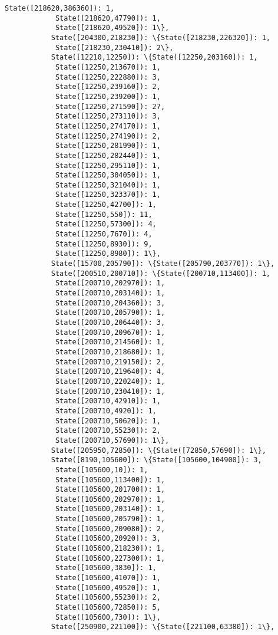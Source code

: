\documentclass[11pt]{article}
\begin{document}
\begin{Verbatim}[commandchars=\\\{\}]
            State([218620,386360]): 1,
            State([218620,47790]): 1,
            State([218620,49520]): 1\},
           State([204300,218230]): \{State([218230,226320]): 1,
            State([218230,230410]): 2\},
           State([12210,12250]): \{State([12250,203160]): 1,
            State([12250,213670]): 1,
            State([12250,222880]): 3,
            State([12250,239160]): 2,
            State([12250,239200]): 1,
            State([12250,271590]): 27,
            State([12250,273110]): 3,
            State([12250,274170]): 1,
            State([12250,274190]): 2,
            State([12250,281990]): 1,
            State([12250,282440]): 1,
            State([12250,295110]): 1,
            State([12250,304050]): 1,
            State([12250,321040]): 1,
            State([12250,323370]): 1,
            State([12250,42700]): 1,
            State([12250,550]): 11,
            State([12250,57300]): 4,
            State([12250,7670]): 4,
            State([12250,8930]): 9,
            State([12250,8980]): 1\},
           State([15700,205790]): \{State([205790,203770]): 1\},
           State([200510,200710]): \{State([200710,113400]): 1,
            State([200710,202970]): 1,
            State([200710,203140]): 1,
            State([200710,204360]): 3,
            State([200710,205790]): 1,
            State([200710,206440]): 3,
            State([200710,209670]): 1,
            State([200710,214560]): 1,
            State([200710,218680]): 1,
            State([200710,219150]): 2,
            State([200710,219640]): 4,
            State([200710,220240]): 1,
            State([200710,230410]): 1,
            State([200710,42910]): 1,
            State([200710,4920]): 1,
            State([200710,50620]): 1,
            State([200710,55230]): 2,
            State([200710,57690]): 1\},
           State([205950,72850]): \{State([72850,57690]): 1\},
           State([8190,105600]): \{State([105600,104900]): 3,
            State([105600,10]): 1,
            State([105600,113400]): 1,
            State([105600,201700]): 1,
            State([105600,202970]): 1,
            State([105600,203140]): 1,
            State([105600,205790]): 1,
            State([105600,209080]): 2,
            State([105600,20920]): 3,
            State([105600,218230]): 1,
            State([105600,227300]): 1,
            State([105600,3830]): 1,
            State([105600,41070]): 1,
            State([105600,49520]): 1,
            State([105600,55230]): 2,
            State([105600,72850]): 5,
            State([105600,730]): 1\},
           State([250900,221100]): \{State([221100,63380]): 1\},

\end{Verbatim}
\end{document}
